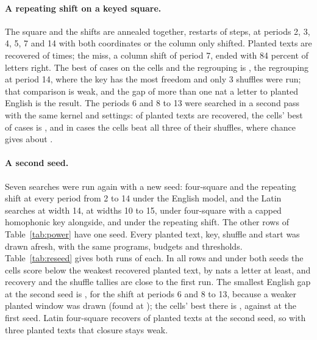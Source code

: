 \documentclass[11pt]{article}
\theoremstyle{definition}
\begin{document}
\paragraph{A repeating shift on a keyed square.} The square and the shifts are annealed together, \addRestarts{} restarts of \addSteps{} steps, at periods 2, 3, 4, 5, 7 and 14 with both coordinates or the column only shifted. Planted texts are recovered \addRecovered{} of \addPlanted{} times; the miss, a column shift of period 7, ended with 84 percent of letters right. The best of \addCases{} cases on the cells and the regrouping is \addBest{}, the regrouping at period 14, where the key has the most freedom and only 3 shuffles were run; that comparison is weak, and the gap of more than one nat a letter to planted English is the result. The periods 6 and 8 to 13 were searched in a second pass with the same kernel and settings: \sgEnRecovered{} of \sgEnPlanted{} planted texts are recovered, the cells' best of \sgEnCases{} cases is \sgEnBest{}, and in \sgEnAbove{} cases the cells beat all three of their shuffles, where chance gives about \sgEnChance{}.

\paragraph{A second seed.} Seven searches were run again with a new seed: four-square and the repeating shift at every period from 2 to 14 under the English model, and the Latin searches at width 14, at widths 10 to 15, under four-square with a capped homophonic key alongside, and under the repeating shift. The other rows of Table~\ref{tab:power} have one seed. Every planted text, key, shuffle and start was drawn afresh, with the same programs, budgets and thresholds. Table~\ref{tab:reseed} gives both runs of each. In all \rsRows{} rows and under both seeds the cells score below the weakest recovered planted text, by \rsGapLow{} nats a letter at least, and recovery and the shuffle tallies are close to the first run. The smallest English gap at the second seed is \rsEnglishLow{}, for the shift at periods 6 and 8 to 13, because a weaker planted window was drawn (found at \rsEnglishLowFound{}); the cells' best there is \rsEnglishLowCells{}, against \rsEnglishLowFirstCells{} at the first seed. Latin four-square recovers \rsLaFsRecovered{} of \rsLaFsPlanted{} planted texts at the second seed, so with three planted texts that closure stays weak.

\begin{table}[t]
\centering
\caption{The searches run under two seeds. ``Found'' counts planted texts recovered with at least 90 percent of letters (or clean cells) right. ``Weakest'' is the found score per letter of the weakest recovered planted text, which differs from Table~\ref{tab:power}'s true-key score; ``Gap'' is it minus the cells' best, over the printed cells and the regrouping where the search ran it. ``As high'' counts shuffle searches reaching the cells' scores, over every case of the search. Rows naming no language use the English model.}
\label{tab:reseed}
\small

\end{table}
\end{document}
